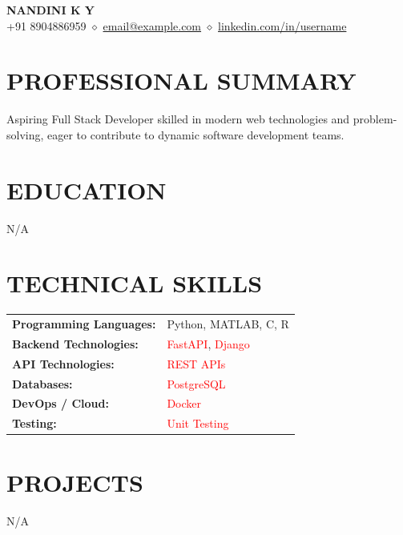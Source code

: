 \documentclass[9.5pt,a4paper]{extarticle}
\begin{document}
\begin{center}
{\Large \textbf{NANDINI K Y}} \\ \vspace{2pt}
+91 8904886959 $\diamond$ \href{mailto:email@example.com}{email@example.com} $\diamond$ \href{https://linkedin.com/in/username}{linkedin.com/in/username}
\end{center}

\section*{PROFESSIONAL SUMMARY}
Aspiring Full Stack Developer skilled in modern web technologies and problem-solving, eager to contribute to dynamic software development teams.

\section*{EDUCATION}
N/A


\section*{TECHNICAL SKILLS}
\begin{tabular}{@{}p{2.3in}p{4.6in}@{}}
\textbf{Programming Languages:} & Python, MATLAB, C, R \\
\textbf{Backend Technologies:} & \textcolor{red}{FastAPI}, \textcolor{red}{Django} \\
\textbf{API Technologies:} & \textcolor{red}{REST APIs} \\
\textbf{Databases:} & \textcolor{red}{PostgreSQL} \\
\textbf{DevOps / Cloud:} & \textcolor{red}{Docker} \\
\textbf{Testing:} & \textcolor{red}{Unit Testing} \\
\end{tabular}



\section*{PROJECTS}
N/A


\end{document}
